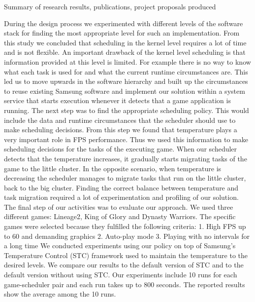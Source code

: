 Summary of research results, publications, project proposals produced

During the design process we experimented with different levels of the software stack for finding the most appropriate level for such an implementation. From this study we concluded that scheduling in the kernel level requires a lot of time and is not flexible. An important drawback of the kernel level scheduling is that information provided at this level is limited. For example there is no way to know what each task is used for and what the current runtime circumstances are. This led us to move upwards in the software hierarchy and built up the circumstances to reuse existing Samsung software and implement our solution within a system service that starts execution whenever it detects that a game application is running.
The next step was to find the appropriate scheduling policy. This would include the data and runtime circumstances that the scheduler should use to make scheduling decisions. From this step we found that temperature plays a very important role in FPS performance. Thus we used this information to make scheduling decisions for the tasks of the executing game. When our scheduler detects that the temperature increases, it gradually starts migrating tasks of the game to the little cluster. In the opposite scenario, when temperature is decreasing the scheduler manages to migrate tasks that run on the little cluster, back to the big cluster. Finding the correct balance between temperature and task migration required a lot of experimentation and profiling of our solution. 
The final step of our activities was to evaluate our approach. We used three different games: Lineage2, King of Glory and Dynasty Warriors. The specific games were selected because they fulfilled the following criteria:
1.	High FPS up to 60 and demanding graphics
2.	Auto-play mode
3.	Playing with no intervals for a long time
We conducted experiments using our policy on top of Samsung’s Temperature Control (STC) framework used to maintain the temperature to the desired levels. We compare our results to the default version of STC and to the default version without using STC. Our experiments include 10 runs for each game-scheduler pair and each run takes up to 800 seconds. The reported results show the average among the 10 runs.


